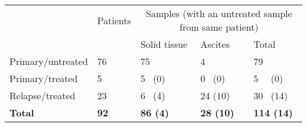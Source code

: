 \documentclass{bmcart}
\begin{document}

\begin{table}[]
\centering
\begin{tabular}{lllll}
                  & Patients & \multicolumn{3}{c}{Samples (with an untreated sample from same patient)} \\
                  &          & Solid tissue              & Ascites              & Total                 \\
Primary/untreated & 76       & 75                        & 4                    & 79                    \\
Primary/treated   & 5        & 5 \, (0)                     & 0 \, (0)                & 5 \, \, (0)                 \\
Relapse/treated   & 23       & 6 \, (4)                     & 24 (10)              & 30 \, (14)               \\
\textbf{Total}             & \textbf{92}       & \textbf{86 (4)}                    & \textbf{28 (10)}              & \textbf{114 (14)}             
\end{tabular}
\end{table}
\end{document}
